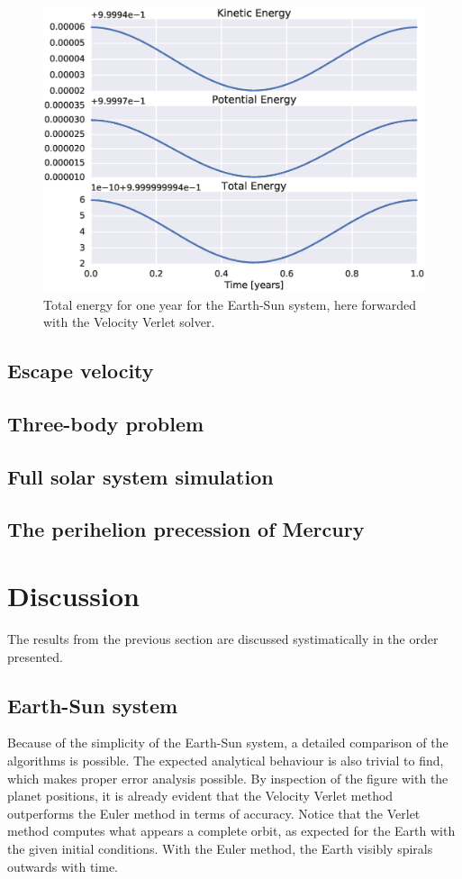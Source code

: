 \documentclass[aps,reprint]{revtex4-1}
\begin{document}
\begin{figure}[H]
  \includegraphics[width=\columnwidth]{figures/energy_verlet.eps}
  \caption{Total energy for one year for the Earth-Sun system, here forwarded
  with the Velocity Verlet solver.}
  \label{fig:verletenergy}
\end{figure}
\subsection{Escape velocity}

\subsection{Three-body problem}
\subsection{Full solar system simulation}
\subsection{The perihelion precession of Mercury}

\section{Discussion}
\label{sec:discussion}
The results from the previous section are discussed systimatically in the order
presented.
\subsection{Earth-Sun system}
Because of the simplicity of the Earth-Sun system, a detailed comparison of the
algorithms is possible. The expected analytical behaviour is also trivial to
find, which makes proper error analysis possible. By inspection of the figure with the
planet positions, it is already evident that the Velocity Verlet method outperforms
the Euler method in terms of accuracy. Notice that the Verlet method computes what
appears a complete orbit, as expected for the Earth with the given initial conditions.
With the Euler method, the Earth visibly spirals outwards with time.
\end{document}
